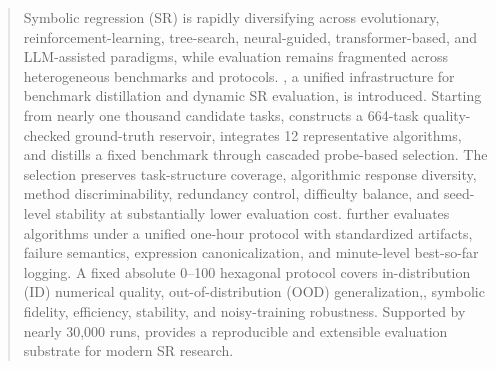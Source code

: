 \begin{abstract}

Symbolic regression (SR) is rapidly diversifying across evolutionary, reinforcement-learning, tree-search, neural-guided, transformer-based, and LLM-assisted paradigms, while evaluation remains fragmented across heterogeneous benchmarks and protocols. \arena{}, a unified infrastructure for benchmark distillation and dynamic SR evaluation, is introduced. Starting from nearly one thousand candidate tasks, \arena{} constructs a 664-task quality-checked ground-truth reservoir, integrates 12 representative algorithms, and distills a fixed \core{} benchmark through cascaded probe-based selection. The selection preserves task-structure coverage, algorithmic response diversity, method discriminability, redundancy control, difficulty balance, and seed-level stability at substantially lower evaluation cost. \arena{} further evaluates algorithms under a unified one-hour protocol with standardized artifacts, failure semantics, expression canonicalization, and minute-level best-so-far logging. A fixed absolute 0--100 hexagonal protocol covers in-distribution (ID) numerical quality, out-of-distribution (OOD) generalization,, symbolic fidelity, efficiency, stability, and noisy-training robustness. Supported by nearly 30,000 runs, \arena{} provides a reproducible and extensible evaluation substrate for modern SR research.
\end{abstract}
